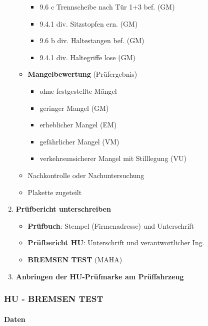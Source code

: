 \documentclass{vorlage-design-main}
\begin{document}
\begin{enumerate}
\begin{itemize}
    \begin{itemize}

    \item
      9.6 c Trennscheibe nach Tür 1+3 bef. (GM)
    \item
      9.4.1 div. Sitzstopfen ern. (GM)
    \item
      9.6 b div. Haltestangen bef. (GM)
    \item
      9.4.1 div. Haltegriffe lose (GM)
    \end{itemize}
  \item
    \textbf{Mangelbewertung} (Prüfergebnis)

    \begin{itemize}

    \item
      ohne festgestellte Mängel
    \item
      geringer Mangel (GM)
    \item
      erheblicher Mangel (EM)
    \item
      gefährlicher Mangel (VM)
    \item
      verkehrsunsicherer Mangel mit Stilllegung (VU)
    \end{itemize}
  \item
    Nachkontrolle oder Nachuntersuchung
  \item
    Plakette zugeteilt
  \end{itemize}
\item
  \textbf{Prüfbericht unterschreiben}

  \begin{itemize}

  \item
    \textbf{Prüfbuch}: Stempel (Firmenadresse) und Unterschrift
  \item
    \textbf{Prüfbericht HU}: Unterschrift und verantwortlicher Ing.
  \item
    \textbf{BREMSEN TEST} (MAHA)
  \end{itemize}
\item
  \textbf{Anbringen der HU-Prüfmarke am Prüffahrzeug}
\end{enumerate}

\subsubsection{HU - BREMSEN TEST}\label{hu---bremsen-test}

\paragraph{Daten}\label{daten}
\end{document}
